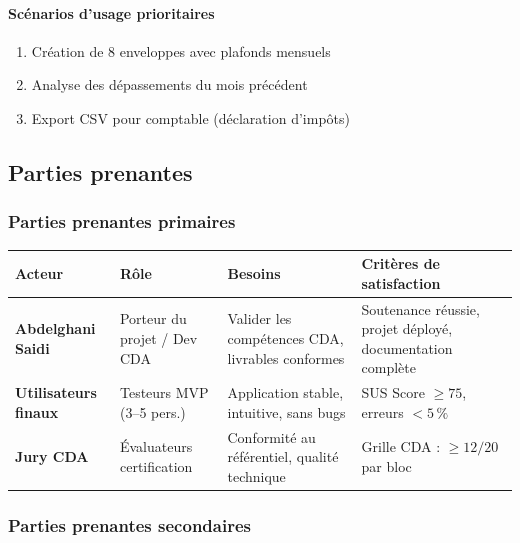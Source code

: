 \paragraph{Scénarios d'usage prioritaires}
\begin{enumerate}
  \item Création de 8 enveloppes avec plafonds mensuels
  \item Analyse des dépassements du mois précédent
  \item Export CSV pour comptable (déclaration d'impôts)
\end{enumerate}

\subsection{Parties prenantes}

\subsubsection{Parties prenantes primaires}

\begin{center}
\small
\begin{tabular}{|p{3cm}|p{2cm}|p{4cm}|p{4.5cm}|}
\hline
\textbf{Acteur} & \textbf{Rôle} & \textbf{Besoins} & \textbf{Critères de satisfaction} \\
\hline
\textbf{Abdelghani Saidi} & Porteur du projet / Dev CDA & Valider les compétences CDA, livrables conformes & Soutenance réussie, projet déployé, documentation complète \\
\hline
\textbf{Utilisateurs finaux} & Testeurs MVP (3--5 pers.) & Application stable, intuitive, sans bugs & SUS Score $\geq 75$, erreurs $< 5\,\%$ \\
\hline
\textbf{Jury CDA} & Évaluateurs certification & Conformité au référentiel, qualité technique & Grille CDA : $\geq 12/20$ par bloc \\
\hline
\end{tabular}
\end{center}

\subsubsection{Parties prenantes secondaires}

